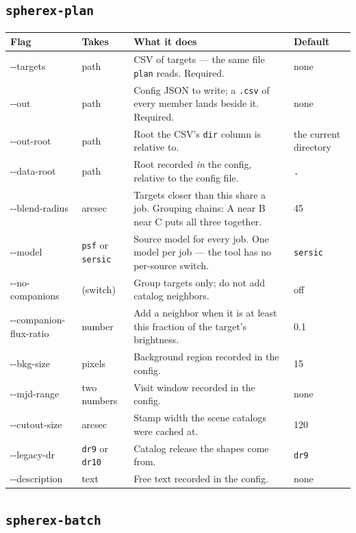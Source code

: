 \documentclass[11pt]{article}
\begin{document}
\subsection{\texttt{spherex-plan}}

\begin{longtable}{T{2.9cm} L{2.15cm} L{6.45cm} L{2.7cm}}
\toprule
\textbf{\normalfont Flag} & \textbf{Takes} & \textbf{What it does} & \textbf{Default} \\
\midrule
\endhead
-{}-targets & path & CSV of targets --- the same file \texttt{plan} reads.
  Required. & none \\[2pt]
-{}-out & path & Config JSON to write; a \texttt{.csv} of every member
  lands beside it. Required. & none \\[2pt]
-{}-out-root & path & Root the CSV's \texttt{dir} column is relative to. &
  the current directory \\[2pt]
-{}-data-root & path & Root recorded \emph{in} the config, relative to the
  config file. & \texttt{.} \\[2pt]
-{}-blend-radius & arcsec & Targets closer than this share a job. Grouping
  chains: A near B near C puts all three together. & 45 \\[2pt]
-{}-model & \texttt{psf} or \texttt{sersic} & Source model for every job.
  One model per job --- the tool has no per-source switch. &
  \texttt{sersic} \\[2pt]
-{}-no-companions & (switch) & Group targets only; do not add catalog
  neighbors. & off \\[2pt]
-{}-companion-flux-ratio & number & Add a neighbor when it is at least this
  fraction of the target's brightness. & 0.1 \\[2pt]
-{}-bkg-size & pixels & Background region recorded in the config. & 15 \\[2pt]
-{}-mjd-range & two numbers & Visit window recorded in the config. & none \\[2pt]
-{}-cutout-size & arcsec & Stamp width the scene catalogs were cached at. &
  120 \\[2pt]
-{}-legacy-dr & \texttt{dr9} or \texttt{dr10} & Catalog release the shapes
  come from. & \texttt{dr9} \\[2pt]
-{}-description & text & Free text recorded in the config. & none \\
\bottomrule
\end{longtable}

\subsection{\texttt{spherex-batch}}
\end{document}
